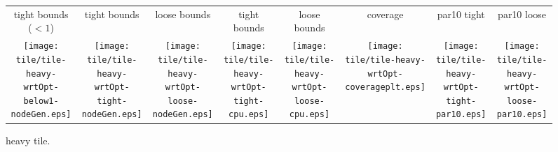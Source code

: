 \documentclass[a4paper,landscape]{article}
\begin{document}
\begin{figure}[t]
	\centering
	\begin{tabular}{c c c c c c c c}
	    tight bounds ($<1$) & tight bounds & loose bounds & tight bounds & loose bounds & coverage & par10 tight & par10 loose\\
	   \begin{minipage}{\cpufigureplotwidth}
      \texttt{[image: tile/tile-heavy-wrtOpt-below1-nodeGen.eps]}
        \end{minipage}&
        \begin{minipage}{\cpufigureplotwidth}
        \texttt{[image: tile/tile-heavy-wrtOpt-tight-nodeGen.eps]}
        \end{minipage}&
        \begin{minipage}{\cpufigureplotwidth}
      \texttt{[image: tile/tile-heavy-wrtOpt-loose-nodeGen.eps]}
        \end{minipage}&
        \begin{minipage}{\cpufigureplotwidth}
        \texttt{[image: tile/tile-heavy-wrtOpt-tight-cpu.eps]}
        \end{minipage}&
        \begin{minipage}{\cpufigureplotwidth}
        \texttt{[image: tile/tile-heavy-wrtOpt-loose-cpu.eps]}
        \end{minipage}&
        \begin{minipage}{\cpufigureplotwidth}
        \texttt{[image: tile/tile-heavy-wrtOpt-coverageplt.eps]}
        \end{minipage}&
        \begin{minipage}{\cpufigureplotwidth}
        \texttt{[image: tile/tile-heavy-wrtOpt-tight-par10.eps]}
        \end{minipage}&
        \begin{minipage}{\cpufigureplotwidth}
        \texttt{[image: tile/tile-heavy-wrtOpt-loose-par10.eps]}
        \end{minipage}
	\end{tabular}
	\caption{heavy tile.}
    \label{fig:tile-heavy}
\end{figure}
\end{document}
